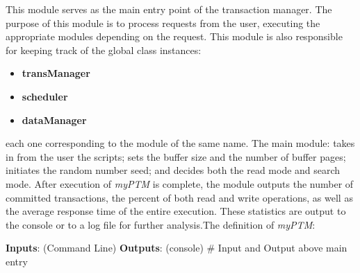 This module serves as the main entry point of the transaction manager. The purpose of this module is to process requests from the user, executing the appropriate modules depending on the request. This module is also responsible for keeping track of the global class instances:

\begin{itemize}
 \item \textbf{transManager} 
 \item \textbf{scheduler} 
 \item  \textbf{dataManager} 
 \end{itemize}

each one corresponding to the module of the same name. The main module: takes in from the user the scripts; sets the buffer size and the number of buffer pages; initiates the random number seed; and decides both the read mode and search mode. After execution of \textit{myPTM} is complete, the module outputs the number of committed transactions, the percent of both read and write operations, as well as the average response time of the entire execution. These statistics are output to the console or to a log file for further analysis.The definition of \textit{myPTM}:\\

\begin{mdframed}
\begin{algorithmic}[H]

    \State \textbf{Inputs}: (Command Line)
    \State {}
    \State {}
     \State {}
     \State {}
     \State {}
      \State {}
      \State {}
      \State \textbf{Outputs}: (console)
       \State {}
        \State {}
         \State {}
    	 \State {}
	\State \# Input and Output above
	 {} 
	\State main entry
	\EndFunction  
\end{algorithmic} 
\end{mdframed} 